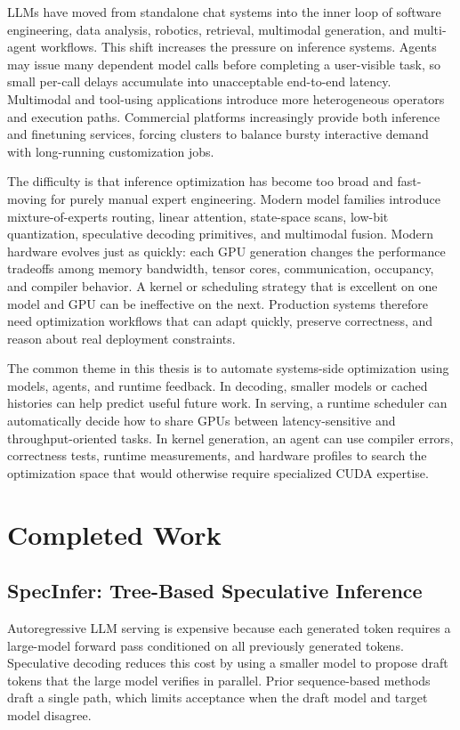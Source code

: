 \documentclass[11pt]{article}
\newcommand{\SpecInfer}{SpecInfer}
\begin{document}
LLMs have moved from standalone chat systems into the inner loop of software engineering, data analysis, robotics, retrieval, multimodal generation, and multi-agent workflows. This shift increases the pressure on inference systems. Agents may issue many dependent model calls before completing a user-visible task, so small per-call delays accumulate into unacceptable end-to-end latency. Multimodal and tool-using applications introduce more heterogeneous operators and execution paths. Commercial platforms increasingly provide both inference and finetuning services, forcing clusters to balance bursty interactive demand with long-running customization jobs.

The difficulty is that inference optimization has become too broad and fast-moving for purely manual expert engineering. Modern model families introduce mixture-of-experts routing, linear attention, state-space scans, low-bit quantization, speculative decoding primitives, and multimodal fusion. Modern hardware evolves just as quickly: each GPU generation changes the performance tradeoffs among memory bandwidth, tensor cores, communication, occupancy, and compiler behavior. A kernel or scheduling strategy that is excellent on one model and GPU can be ineffective on the next. Production systems therefore need optimization workflows that can adapt quickly, preserve correctness, and reason about real deployment constraints.

The common theme in this thesis is to automate systems-side optimization using models, agents, and runtime feedback. In decoding, smaller models or cached histories can help predict useful future work. In serving, a runtime scheduler can automatically decide how to share GPUs between latency-sensitive and throughput-oriented tasks. In kernel generation, an agent can use compiler errors, correctness tests, runtime measurements, and hardware profiles to search the optimization space that would otherwise require specialized CUDA expertise.

\section{Completed Work}

\subsection{\SpecInfer: Tree-Based Speculative Inference}

Autoregressive LLM serving is expensive because each generated token requires a large-model forward pass conditioned on all previously generated tokens. Speculative decoding reduces this cost by using a smaller model to propose draft tokens that the large model verifies in parallel. Prior sequence-based methods draft a single path, which limits acceptance when the draft model and target model disagree.
\end{document}
